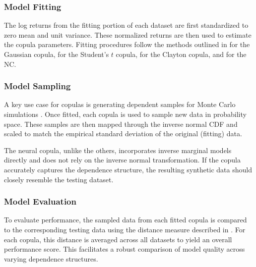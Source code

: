 \subsubsection{Model Fitting}
The log returns from the fitting portion of each dataset are first standardized to zero mean and unit variance. These normalized returns are then used to estimate the copula parameters. Fitting procedures follow the methods outlined in  for the Gaussian copula,  for the Student's $t$ copula,  for the Clayton copula, and  for the \gls{NC}.


\subsubsection{Model Sampling}
A key use case for copulas is generating dependent samples for Monte Carlo simulations \citep[p.~40]{Nelsen2006}. Once fitted, each copula is used to sample new data in probability space. These samples are then mapped through the inverse normal CDF and scaled to match the empirical standard deviation of the original (fitting) data.

The neural copula, unlike the others, incorporates inverse marginal models directly and does not rely on the inverse normal transformation. If the copula accurately captures the dependence structure, the resulting synthetic data should closely resemble the testing dataset.

\subsubsection{Model Evaluation}
To evaluate performance, the sampled data from each fitted copula is compared to the corresponding testing data using the distance measure described in . For each copula, this distance is averaged across all datasets to yield an overall performance score. This facilitates a robust comparison of model quality across varying dependence structures.

